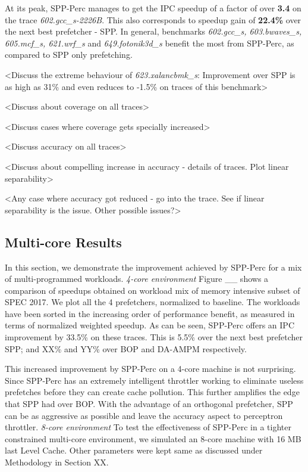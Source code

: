 \documentclass{sig-alternate}
\begin{document}
At its peak, SPP-Perc manages to get the IPC speedup of a factor of over \textbf{3.4} on the trace \textit{602.gcc\_s-2226B}. 
This also corresponds to speedup gain of \textbf{22.4\%} over the next best prefetcher - SPP. 
In general, benchmarks \textit{602.gcc\_s, 603.bwaves\_s, 605.mcf\_s, 621.wrf\_s} and \textit{649.fotonik3d\_s} benefit the most from SPP-Perc, as compared to SPP only prefetching.

<Discuss the extreme behaviour of \textit{623.xalancbmk\_s}: Improvement over SPP is as high as 31\% and even reduces to -1.5\% on traces of this benchmark>

<Discuss about coverage on all traces>

<Discuss cases where coverage gets specially increased>

<Discuss accuracy on all traces>

<Discuss about compelling increase in accuracy - details of traces. Plot linear separability>

<Any case where accuracy got reduced - go into the trace. See if linear separability is the issue. Other possible issues?>


\subsection{Multi-core Results}
In this section, we demonstrate the improvement achieved by SPP-Perc for a mix of multi-programmed workloads. 
\newline \newline
\textit{4-core environment}
Figure \_\_ shows a comparison of speedups obtained on workload mix of memory intensive subset of SPEC 2017. 
We plot all the 4 prefetchers, normalized to baseline. 
The workloads have been sorted in the increasing order of performance benefit, as measured in terms of normalized weighted speedup. 
As can be seen, SPP-Perc offers an IPC improvement by 33.5\% on these traces. 
This is 5.5\% over the next best prefetcher SPP; and XX\% and YY\% over BOP and DA-AMPM respectively.

This increased improvement by SPP-Perc on a 4-core machine is not surprising. 
Since SPP-Perc has an extremely intelligent throttler working to eliminate useless prefetches before they can create cache pollution. 
This further amplifies the edge that SPP had over BOP. 
With the advantage of an orthogonal prefetcher, SPP can be as aggressive as possible and leave the accuracy aspect to perceptron throttler.
\newline \newline
\textit{8-core environment}
To test the effectiveness of SPP-Perc in a tighter constrained multi-core environment, we simulated an 8-core machine with 16 MB last Level Cache. 
Other parameters were kept same as discussed under Methodology in Section XX.
\end{document}
